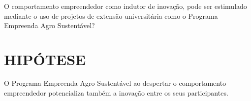 O comportamento empreendedor como indutor de inovação, pode ser estimulado mediante o uso de projetos de extensão universitária como o Programa Empreenda Agro Sustentável? 


\section{HIPÓTESE}

O Programa Empreenda Agro Sustentável ao despertar o comportamento empreendedor potencializa também a inovação entre os seus participantes.








